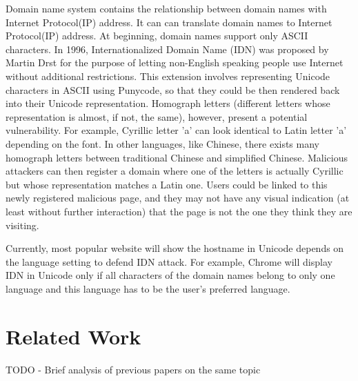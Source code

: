 \documentclass[letterpaper,twocolumn,10pt]{article}
\begin{document}
Domain name system contains the relationship between domain names with Internet Protocol(IP) address.
It can can translate domain names to Internet Protocol(IP) address.
At beginning, domain names support only ASCII characters.
In 1996, Internationalized Domain Name (IDN) was proposed by Martin Drst for the purpose of letting non-English speaking people use Internet without additional restrictions.
This extension involves representing Unicode characters in ASCII using Punycode, so that they could be then rendered back into their Unicode representation.
Homograph letters (different letters whose representation is almost, if not, the same), however, present a potential vulnerability.
For example, Cyrillic letter ’a’ can look identical to Latin letter ’a’ depending on the font.
In other languages, like Chinese, there exists many homograph letters between traditional Chinese and simplified Chinese.
Malicious attackers can then register a domain where one of the letters is actually Cyrillic but whose representation matches a Latin one.
Users could be linked to this newly registered malicious page, and they may not have any visual indication (at least without further interaction) that the page is not the one they think they are visiting.

Currently, most popular website will show the hostname in Unicode depends on the language setting to defend IDN attack.
For example, Chrome will display IDN in Unicode only if all characters of the domain names belong to only one language and this language has to be the user's preferred language.

\section{Related Work}
TODO
- Brief analysis of previous papers on the same topic
\end{document}
